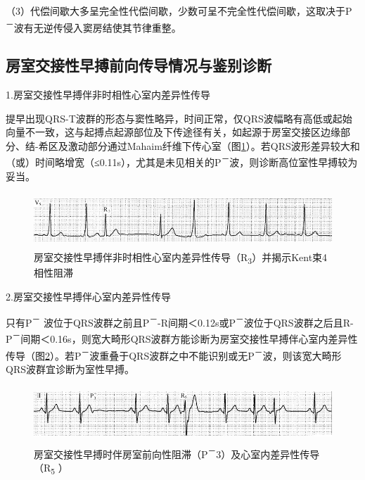 （3）代偿间歇大多呈完全性代偿间歇，少数可呈不完全性代偿间歇，这取决于P\textsuperscript{－}波有无逆传侵入窦房结使其节律重整。

\protect\hypertarget{text00018.htmlux5cux23subid146}{}{}

\subsection{房室交接性早搏前向传导情况与鉴别诊断}

1.房室交接性早搏伴非时相性心室内差异性传导

提早出现QRS-T波群的形态与窦性略异，时间正常，仅QRS波幅略有高低或起始向量不一致，这与起搏点起源部位及下传途径有关，如起源于房室交接区边缘部分、结-希区及激动部分通过Mahaim纤维下传心室（图\ref{fig11-16}）。若QRS波形差异较大和（或）时间略增宽（≤0.11s），尤其是未见相关的P\textsuperscript{－}波，则诊断高位室性早搏较为妥当。

\begin{figure}[!htbp]
 \centering
 \includegraphics[width=5.58333in,height=0.80208in]{./images/Image00176.jpg}
 \captionsetup{justification=centering}
 \caption{房室交接性早搏伴非时相性心室内差异性传导（R\textsubscript{3}）并揭示Kent束4相性阻滞}
 \label{fig11-16}
  \end{figure} 


2.房室交接性早搏伴心室内差异性传导

只有P\textsuperscript{－} 波位于QRS波群之前且P\textsuperscript{－}-R间期＜0.12s或P\textsuperscript{－}波位于QRS波群之后且R-P\textsuperscript{－}间期＜0.16s，则宽大畸形QRS波群方能诊断为房室交接性早搏伴心室内差异性传导（图\ref{fig11-17}）。若P\textsuperscript{－}波重叠于QRS波群之中不能识别或无P\textsuperscript{－}波，则该宽大畸形QRS波群宜诊断为室性早搏。

\begin{figure}[!htbp]
 \centering
 \includegraphics[width=5.58333in,height=0.82292in]{./images/Image00177.jpg}
 \captionsetup{justification=centering}
 \caption{房室交接性早搏时伴房室前向性阻滞（P\textsuperscript{－}3）及心室内差异性传导（R\textsubscript{5} ）}
 \label{fig11-17}
  \end{figure} 


